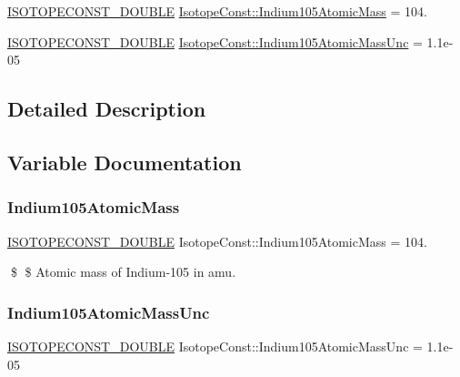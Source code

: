 \begin{DoxyCompactItemize}
\item 
\mbox{\hyperlink{group___isotope_const-_macros_ga8f45a7272ce02c0b4c65c44636ed719a}{I\+S\+O\+T\+O\+P\+E\+C\+O\+N\+S\+T\+\_\+\+D\+O\+U\+B\+LE}} \mbox{\hyperlink{group___isotope_const-_indium-_in105_ga1dce3c1fd95b833fb79027d13db8aa15}{Isotope\+Const\+::\+Indium105\+Atomic\+Mass}} = 104.
\item 
\mbox{\hyperlink{group___isotope_const-_macros_ga8f45a7272ce02c0b4c65c44636ed719a}{I\+S\+O\+T\+O\+P\+E\+C\+O\+N\+S\+T\+\_\+\+D\+O\+U\+B\+LE}} \mbox{\hyperlink{group___isotope_const-_indium-_in105_gafbfd43d3a71958498da1e629276a6592}{Isotope\+Const\+::\+Indium105\+Atomic\+Mass\+Unc}} = 1.\+1e-\/05
\end{DoxyCompactItemize}


\subsection{Detailed Description}


\subsection{Variable Documentation}
\mbox{\label{group___isotope_const-_indium-_in105_ga1dce3c1fd95b833fb79027d13db8aa15}} 
\subsubsection{\texorpdfstring{Indium105\+Atomic\+Mass}{Indium105AtomicMass}}
{\footnotesize\ttfamily \mbox{\hyperlink{group___isotope_const-_macros_ga8f45a7272ce02c0b4c65c44636ed719a}{I\+S\+O\+T\+O\+P\+E\+C\+O\+N\+S\+T\+\_\+\+D\+O\+U\+B\+LE}} Isotope\+Const\+::\+Indium105\+Atomic\+Mass = 104.}

\$ \$ Atomic mass of Indium-\/105 in amu. \mbox{\label{group___isotope_const-_indium-_in105_gafbfd43d3a71958498da1e629276a6592}} 
\subsubsection{\texorpdfstring{Indium105\+Atomic\+Mass\+Unc}{Indium105AtomicMassUnc}}
{\footnotesize\ttfamily \mbox{\hyperlink{group___isotope_const-_macros_ga8f45a7272ce02c0b4c65c44636ed719a}{I\+S\+O\+T\+O\+P\+E\+C\+O\+N\+S\+T\+\_\+\+D\+O\+U\+B\+LE}} Isotope\+Const\+::\+Indium105\+Atomic\+Mass\+Unc = 1.\+1e-\/05}

